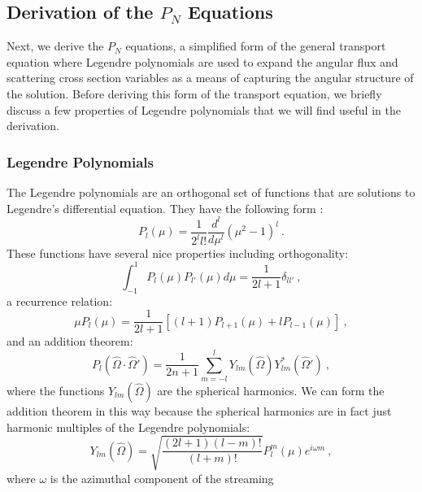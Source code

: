 \documentclass[letterpaper,12pt]{article}
\begin{document}
\subsection{Derivation of the $P_N$ Equations}
\label{subsec:pn_equations}
Next, we derive the $P_N$ equations, a simplified form of the general
transport equation where Legendre polynomials are used to expand the
angular flux and scattering cross section variables as a means of
capturing the angular structure of the solution. Before deriving this
form of the transport equation, we briefly discuss a few properties of
Legendre polynomials that we will find useful in the derivation.

\subsubsection{Legendre Polynomials}
\label{subsubsec:legendre_polys}
The Legendre polynomials are an orthogonal set of functions that
are solutions to Legendre's differential equation. They have the
following form \cite{lewis_computational_1993}:
\begin{equation}
  P_l(\mu) = \frac{1}{2^l l!}\frac{d^l}{d \mu^l}(\mu^2-1)^l\:.
  \label{eq:general_legendre_poly}
\end{equation}
These functions have several nice properties including orthogonality:
\begin{equation}
  \int_{-1}^{1} P_l(\mu) P_{l'}(\mu) d\mu = \frac{1}{2l+1}\delta_{l l'}\:,
  \label{eq:legendre_orthog}
\end{equation}
a recurrence relation:
\begin{equation}
  \mu P_l(\mu) = \frac{1}{2l+1}[(l+1)P_{l+1}(\mu) + l P_{l-1}(\mu)]\:,
  \label{eq:legendre_recurrence}
\end{equation}
and an addition theorem:
\begin{equation}
  P_l(\hat{\Omega} \cdot \hat{\Omega}') = \frac{1}{2n+1}\sum_{m=-l}^l
  Y_{lm}(\hat{\Omega})Y^*_{lm}(\hat{\Omega}')\:,
  \label{eq:legendre_addition}
\end{equation}
where the functions $Y_{lm}(\hat{\Omega})$ are the spherical
harmonics. We can form the addition theorem in this way because the
spherical harmonics are in fact just harmonic multiples of the
Legendre polynomials:
\begin{equation}
  Y_{lm}(\hat{\Omega}) =
  \sqrt{\frac{(2l+1)(l-m)!}{(l+m)!}}P^m_l(\mu)e^{i \omega m}\:,
  \label{eq:spherical_harmonic}
\end{equation}
where $\omega$ is the azimuthal component of the streaming
\end{document}
